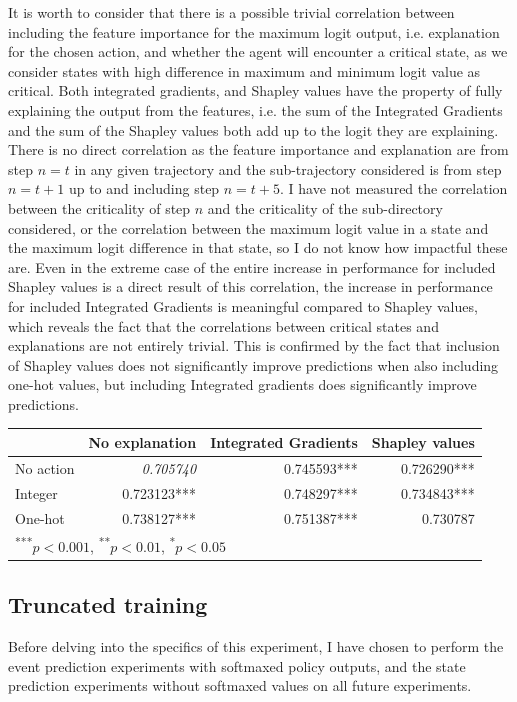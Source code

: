 \documentclass[UKenglish]{uiomasterthesis}
\begin{document}
It is worth to consider that there is a possible trivial correlation between including the feature importance for the maximum logit output, i.e. explanation for the chosen action, and whether the agent will encounter a critical state, as we consider states with high difference in maximum and minimum logit value as critical. Both integrated gradients, and Shapley values have the property of fully explaining the output from the features, i.e. the sum of the Integrated Gradients and the sum of the Shapley values both add up to the logit they are explaining. There is no direct correlation as the feature importance and explanation are from step $n = t$ in any given trajectory and the sub-trajectory considered is from step $n=t+1$ up to and including step $n=t+5$. I have not measured the correlation between the criticality of step $n$ and the criticality of the sub-directory considered, or the correlation between the maximum logit value in a state and the maximum logit difference in that state, so I do not know how impactful these are. Even in the extreme case of the entire increase in performance for included Shapley values is a direct result of this correlation, the increase in performance for included Integrated Gradients is meaningful compared to Shapley values, which reveals the fact that the correlations between critical states and explanations are not entirely trivial. This is confirmed by the fact that inclusion of Shapley values does not significantly improve predictions when also including one-hot values, but including Integrated gradients does significantly improve predictions.

\begin{center}
\label{tab:crit_simpl_log}
\begin{tabular}{lrrr}
\toprule
& No explanation & Integrated Gradients & Shapley values \\
\midrule
No action & \textit{0.705740} & 0.745593*** & 0.726290*** \\
Integer & 0.723123*** & 0.748297*** & 0.734843*** \\
One-hot & 0.738127*** & 0.751387*** & 0.730787 \\
\bottomrule
\multicolumn{3}{l}{\textsuperscript{***}$p<0.001$, 
  \textsuperscript{**}$p<0.01$, 
  \textsuperscript{*}$p<0.05$}
\end{tabular}
\end{center}


\subsection{Truncated training}
Before delving into the specifics of this experiment, I have chosen to perform the event prediction experiments with softmaxed policy outputs, and the state prediction experiments without softmaxed values on all future experiments.
\end{document}
